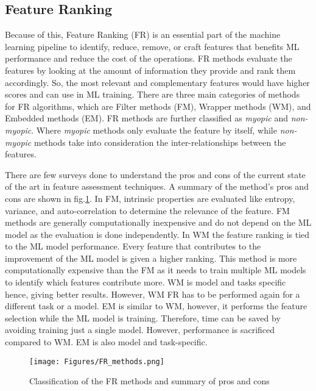 \subsection{Feature Ranking}

Because of this, Feature Ranking (FR) is an essential part of the machine learning pipeline to identify, reduce, remove, or craft features that benefits ML performance and reduce the cost of the operations. FR methods evaluate the features by looking at the amount of information they provide and rank them accordingly. So, the most relevant and complementary features would have higher scores and can use in ML training. There are three main categories of methods for FR algorithms, which are Filter methods (FM), Wrapper methods (WM), and Embedded methods (EM). FR methods are further classified as \emph{myopic} and \emph{non-myopic}. Where \emph{myopic} methods only evaluate the feature by itself, while \emph{non-myopic} methods take into consideration the inter-relationships between the features.

There are few surveys done to understand the pros and cons of the current state of the art in feature assessment techniques\cite{Uthman2020, Sangodiah2014, Effrosynidis2021, Jovic2015}. A summary of the method's pros and cons are shown in fig.\ref{fig: FR_methods}. In FM, intrinsic properties are evaluated like entropy, variance, and auto-correlation to determine the relevance of the feature. FM methods are generally computationally inexpensive and do not depend on the ML model as the evaluation is done independently. In WM the feature ranking is tied to the ML model performance. Every feature that contributes to the improvement of the ML model is given a higher ranking. This method is more computationally expensive than the FM as it needs to train multiple ML models to identify which features contribute more. WM is model and tasks specific hence, giving better results. However, WM FR has to be performed again for a different task or a model. EM is similar to WM, however, it performs the feature selection while the ML model is training. Therefore, time can be saved by avoiding training just a single model. However, performance is sacrificed compared to WM\@. EM is also model and task-specific. 

\begin{figure}[!t]
    \centering
    \texttt{[image: Figures/FR\_methods.png]}
     \caption{Classification of the FR methods and summary of pros and cons}\label{fig: FR_methods}
\end{figure}


